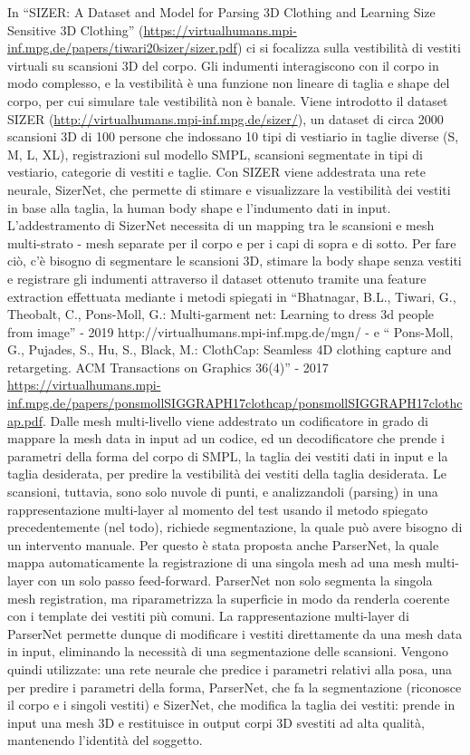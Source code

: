 In “SIZER: A Dataset and Model for Parsing 3D Clothing and Learning Size Sensitive 3D Clothing” (\url{https://virtualhumans.mpi-inf.mpg.de/papers/tiwari20sizer/sizer.pdf}) ci si focalizza sulla vestibilità di vestiti virtuali su scansioni 3D del corpo. Gli indumenti interagiscono con il corpo in modo complesso, e la vestibilità è una funzione non lineare di taglia e shape del corpo, per cui simulare tale vestibilità non è banale. Viene introdotto il dataset SIZER (\url{http://virtualhumans.mpi-inf.mpg.de/sizer/}), un dataset di circa 2000 scansioni 3D di 100 persone che indossano 10 tipi di vestiario in taglie diverse (S, M, L, XL), registrazioni sul modello SMPL, scansioni segmentate in tipi di vestiario, categorie di vestiti e taglie.
Con SIZER viene addestrata una rete neurale, SizerNet, che permette di stimare e visualizzare la vestibilità dei vestiti in base alla taglia, la human body shape e l’indumento dati in input. L’addestramento di SizerNet necessita di un mapping tra le scansioni e mesh multi-strato - mesh separate per il corpo e per i capi di sopra e di sotto. Per fare ciò, c’è bisogno di segmentare le scansioni 3D, stimare la body shape senza vestiti e registrare gli indumenti attraverso il dataset ottenuto tramite una feature extraction effettuata mediante i metodi spiegati in “Bhatnagar, B.L., Tiwari, G., Theobalt, C., Pons-Moll, G.: Multi-garment net: Learning to dress 3d people from image” - 2019 http://virtualhumans.mpi-inf.mpg.de/mgn/ - e “ Pons-Moll, G., Pujades, S., Hu, S., Black, M.: ClothCap: Seamless 4D clothing capture and retargeting. ACM Transactions on Graphics 36(4)” - 2017 \url{https://virtualhumans.mpi-inf.mpg.de/papers/ponsmollSIGGRAPH17clothcap/ponsmollSIGGRAPH17clothcap.pdf}.
Dalle mesh multi-livello viene addestrato un codificatore in grado di mappare la mesh data in input ad un codice, ed un decodificatore che prende i parametri della forma del corpo di SMPL, la taglia dei vestiti dati in input e la taglia desiderata, per predire la vestibilità dei vestiti della taglia desiderata. Le scansioni, tuttavia, sono solo nuvole di punti, e analizzandoli (parsing) in una rappresentazione multi-layer al momento del test usando il metodo spiegato precedentemente (nel todo), richiede segmentazione, la quale può avere bisogno di un intervento manuale. Per questo è stata proposta anche ParserNet, la quale mappa automaticamente la registrazione di una singola mesh ad una mesh multi-layer con un solo passo feed-forward. ParserNet non solo segmenta la singola mesh registration, ma riparametrizza la superficie in modo da renderla coerente con i template dei vestiti più comuni.
La rappresentazione multi-layer di ParserNet permette dunque di modificare i vestiti direttamente da una mesh data in input, eliminando la necessità di una segmentazione delle scansioni.
Vengono quindi utilizzate: una rete neurale che predice i parametri relativi alla posa, una per predire i parametri della forma, ParserNet, che fa la segmentazione (riconosce il corpo e i singoli vestiti) e SizerNet, che modifica la taglia dei vestiti: prende in input una mesh 3D e restituisce in output corpi 3D svestiti ad alta qualità, mantenendo l’identità del soggetto.


